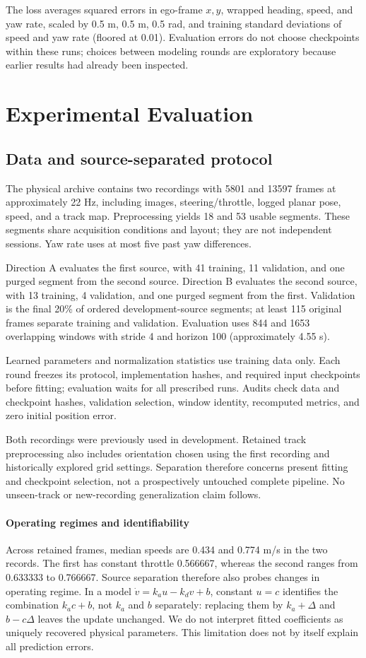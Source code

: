 \documentclass[preprint,12pt]{elsarticle}
\begin{document}
The loss averages squared errors in ego-frame $x,y$, wrapped heading, speed,
and yaw rate, scaled by 0.5 m, 0.5 m, 0.5 rad, and training standard deviations
of speed and yaw rate (floored at 0.01). Evaluation errors do not choose
checkpoints within these runs; choices between modeling rounds are exploratory
because earlier results had already been inspected.

\section{Experimental Evaluation}\label{sec:experiments}\label{sec:setup}
\subsection{Data and source-separated protocol}
The physical archive contains two recordings with 5801 and 13597 frames at
approximately 22 Hz, including images, steering/throttle, logged planar pose,
speed, and a track map. Preprocessing yields 18 and 53 usable segments.
These segments share acquisition conditions and layout; they are not independent
sessions. Yaw rate uses at most five past yaw differences.

Direction A evaluates the first source, with 41 training, 11 validation, and one
purged segment from the second source. Direction B evaluates the second source,
with 13 training, 4 validation, and one purged segment from the first.
Validation is the final 20\% of ordered development-source segments; at least
115 original frames separate training and validation. Evaluation uses 844 and
1653 overlapping windows with stride 4 and horizon 100 (approximately 4.55 s).

Learned parameters and normalization statistics use training data only. Each
round freezes its protocol, implementation hashes, and required input checkpoints
before fitting; evaluation waits for all prescribed runs. Audits check data and
checkpoint hashes, validation selection, window identity, recomputed metrics,
and zero initial position error.

Both recordings were previously used in development. Retained track preprocessing
also includes orientation chosen using the first recording and historically
explored grid settings. Separation therefore concerns present fitting and
checkpoint selection, not a prospectively untouched complete pipeline.
No unseen-track or new-recording generalization claim follows.


\paragraph{Operating regimes and identifiability}
Across retained frames, median speeds are 0.434 and 0.774 m/s in the two records.
The first has constant throttle 0.566667, whereas the second ranges from
0.633333 to 0.766667. Source separation therefore also probes changes in operating
regime. In a model $\dot v=k_a u-k_dv+b$, constant $u=c$ identifies the combination
$k_ac+b$, not $k_a$ and $b$ separately: replacing them by $k_a+\Delta$ and
$b-c\Delta$ leaves the update unchanged. We do not interpret fitted coefficients
as uniquely recovered physical parameters. This limitation does not by itself
explain all prediction errors.
\end{document}
